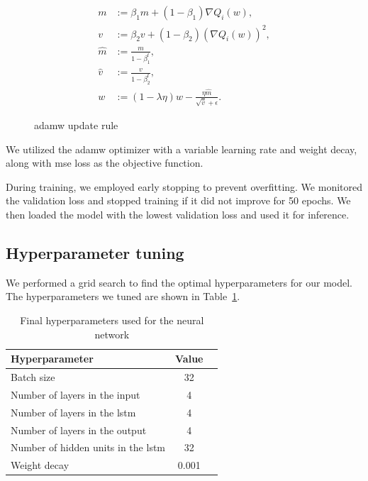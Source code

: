 \begin{figure}[H]
    \begin{align*}
        m       & := \beta_1 m + (1 - \beta_1) \nabla Q_i(w),                               \\
        v       & := \beta_2 v + (1 - \beta_2) (\nabla Q_i(w))^2,                           \\
        \hat{m} & := \frac{m}{1 - \beta_1^t},                                               \\
        \hat{v} & := \frac{v}{1 - \beta_2^t},                                               \\
        w       & := (1 - \lambda \eta) w - \frac{\eta \hat{m}}{\sqrt{\hat{v}} + \epsilon}.
    \end{align*}
    \caption{\gls{adamw} update rule}
\end{figure}

We utilized the \gls{adamw} optimizer with a variable learning rate and weight
decay, along with \gls{mse} loss as the objective function.

During training, we employed early stopping to prevent overfitting. We
monitored the validation loss and stopped training if it did not improve for 50
epochs. We then loaded the model with the lowest validation loss and used it
for inference.

\subsection{Hyperparameter tuning}

We performed a grid search to find the optimal hyperparameters for our model.
The hyperparameters we tuned are shown in
Table~\ref{tab:final-hyperparameters}.

\begin{table}[h]
    \centering
    \begin{tabular}{l c c}
        \toprule
        \textbf{Hyperparameter}                  & \textbf{Value} \\
        \midrule
        Batch size                               & 32             \\
        Number of layers in the input            & 4              \\
        Number of layers in the \gls{lstm}       & 4              \\
        Number of layers in the output           & 4              \\
        Number of hidden units in the \gls{lstm} & 32             \\
        Weight decay                             & 0.001          \\
        \bottomrule
    \end{tabular}
    \caption{Final hyperparameters used for the neural network}
    \label{tab:final-hyperparameters}
\end{table}

